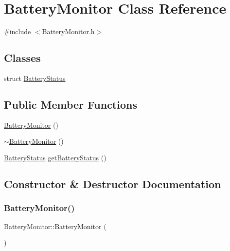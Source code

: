 \hypertarget{classBatteryMonitor}{}\section{Battery\+Monitor Class Reference}
\label{classBatteryMonitor}


{\ttfamily \#include $<$Battery\+Monitor.\+h$>$}

\subsection*{Classes}
\begin{DoxyCompactItemize}
\item 
struct \mbox{\hyperlink{structBatteryMonitor_1_1BatteryStatus}{Battery\+Status}}
\end{DoxyCompactItemize}
\subsection*{Public Member Functions}
\begin{DoxyCompactItemize}
\item 
\mbox{\hyperlink{classBatteryMonitor_a18d0b41efbbd1f94668666d3a7bd246e}{Battery\+Monitor}} ()
\item 
\mbox{\hyperlink{classBatteryMonitor_ade860ba6ffe04195873a36dec4e287a7}{$\sim$\+Battery\+Monitor}} ()
\item 
\mbox{\hyperlink{structBatteryMonitor_1_1BatteryStatus}{Battery\+Status}} \mbox{\hyperlink{classBatteryMonitor_aa1d9ec63974c47884c294f82637f152f}{get\+Battery\+Status}} ()
\end{DoxyCompactItemize}


\subsection{Constructor \& Destructor Documentation}
\mbox{\label{classBatteryMonitor_a18d0b41efbbd1f94668666d3a7bd246e}} 
\subsubsection{\texorpdfstring{Battery\+Monitor()}{BatteryMonitor()}}
{\footnotesize\ttfamily Battery\+Monitor\+::\+Battery\+Monitor (\begin{DoxyParamCaption}{ }\end{DoxyParamCaption})}

